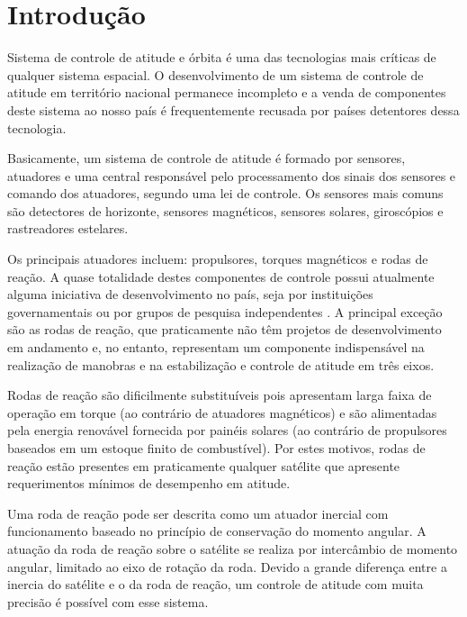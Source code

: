 \cleardoublepage

\pagestyle{fancy}


\chapter{Introdução}\label{intro}

Sistema de controle de atitude e órbita é uma das tecnologias mais críticas de qualquer sistema espacial. O desenvolvimento de um sistema de controle de atitude em território nacional permanece incompleto \citep{Veloso2009} e a venda de componentes deste sistema ao nosso país é frequentemente recusada por países detentores dessa tecnologia.

Basicamente, um sistema de controle de atitude é formado por sensores, atuadores e uma central responsável pelo processamento dos sinais dos sensores e comando dos atuadores, segundo uma lei de controle. Os sensores mais comuns são detectores de horizonte, sensores magnéticos, sensores solares, giroscópios e rastreadores estelares. 

Os principais atuadores incluem: propulsores, torques magnéticos e rodas de reação. A quase totalidade destes componentes de controle possui atualmente alguma iniciativa de desenvolvimento no país, seja por instituições governamentais ou por grupos de pesquisa independentes \citep{PresidenciaRepublica}. A principal exceção são as rodas de reação, que praticamente não têm projetos de desenvolvimento em andamento e, no entanto, representam um componente indispensável na realização de manobras e na estabilização e controle de atitude em três eixos. 

Rodas de reação são dificilmente substituíveis pois apresentam larga faixa de operação em torque (ao contrário de atuadores magnéticos) e são alimentadas pela energia renovável fornecida por painéis solares (ao contrário de propulsores baseados em um estoque finito de combustível). Por estes motivos, rodas de reação estão presentes em praticamente qualquer satélite que apresente requerimentos mínimos de desempenho em atitude.

Uma roda de reação pode ser descrita como um atuador inercial com funcionamento baseado no princípio de conservação do momento angular. A atuação da roda de reação sobre o satélite se realiza por intercâmbio de momento angular, limitado ao eixo de rotação da roda. Devido a grande diferença entre a inercia do satélite e o da roda de reação, um controle de atitude com muita precisão é possível com esse sistema.

